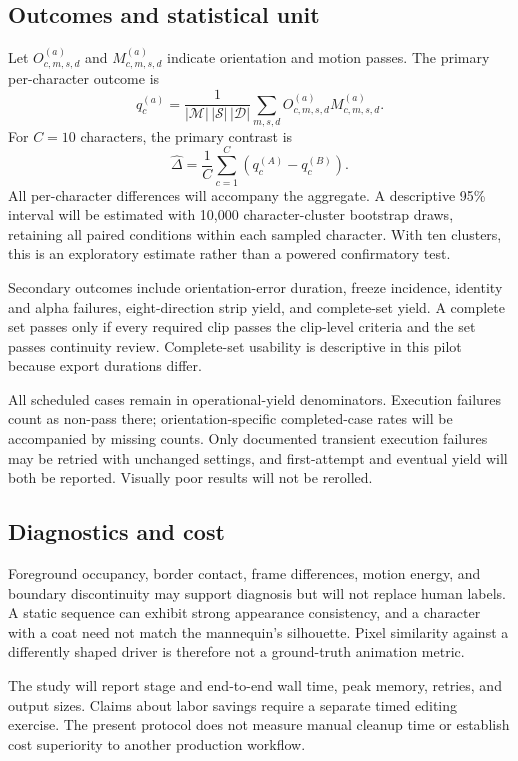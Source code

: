 \documentclass[11pt]{article}
\begin{document}
\subsection{Outcomes and statistical unit}
Let $O^{(a)}_{c,m,s,d}$ and $M^{(a)}_{c,m,s,d}$ indicate orientation and motion passes. The primary per-character outcome is
\begin{equation}
q_c^{(a)}=\frac{1}{|\mathcal{M}|\,|\mathcal{S}|\,|\mathcal{D}|}
\sum_{m,s,d}O^{(a)}_{c,m,s,d}M^{(a)}_{c,m,s,d}.
\end{equation}
For $C=10$ characters, the primary contrast is
\begin{equation}
\widehat{\Delta}=\frac{1}{C}\sum_{c=1}^{C}\left(q_c^{(A)}-q_c^{(B)}\right).
\end{equation}
All per-character differences will accompany the aggregate. A descriptive 95\% interval will be estimated with 10,000 character-cluster bootstrap draws, retaining all paired conditions within each sampled character. With ten clusters, this is an exploratory estimate rather than a powered confirmatory test.

Secondary outcomes include orientation-error duration, freeze incidence, identity and alpha failures, eight-direction strip yield, and complete-set yield. A complete set passes only if every required clip passes the clip-level criteria and the set passes continuity review. Complete-set usability is descriptive in this pilot because export durations differ.

All scheduled cases remain in operational-yield denominators. Execution failures count as non-pass there; orientation-specific completed-case rates will be accompanied by missing counts. Only documented transient execution failures may be retried with unchanged settings, and first-attempt and eventual yield will both be reported. Visually poor results will not be rerolled.

\subsection{Diagnostics and cost}
Foreground occupancy, border contact, frame differences, motion energy, and boundary discontinuity may support diagnosis but will not replace human labels. A static sequence can exhibit strong appearance consistency, and a character with a coat need not match the mannequin's silhouette. Pixel similarity against a differently shaped driver is therefore not a ground-truth animation metric.

The study will report stage and end-to-end wall time, peak memory, retries, and output sizes. Claims about labor savings require a separate timed editing exercise. The present protocol does not measure manual cleanup time or establish cost superiority to another production workflow.
\end{document}
